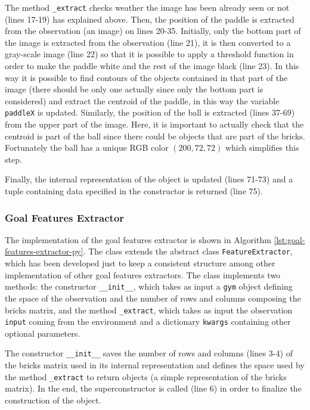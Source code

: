 The method \texttt{\_extract} checks weather the image has been already seen
or not (lines 17-19) has explained above. Then, the position of the paddle
is extracted from the observation (an image) on lines 20-35. Initially,
only the bottom part of the image is extracted from the observation (line 21),
it is then converted to a gray-scale image (line 22) so that it is possible
to apply a threshold function in order to make the paddle white and the
rest of the image black (line 23). In this way it is possible to find contours
of the objects contained in that part of the image (there should be only
one actually since only the bottom part is considered) and extract the centroid
of the paddle, in this way the variable
\texttt{paddleX} is updated. Similarly, the position of the ball is extracted
(lines 37-69) from the upper part of the image. Here, it is important to
actually check that the centroid is part of the ball since there could be
objects that are part of the bricks. Fortunately the ball has a unique RGB color
$(200, 72, 72)$ which simplifies this step.

Finally, the internal representation of the object is updated (lines 71-73)
and a tuple containing data specified in the constructor is returned (line 75).


\subsubsection{Goal Features Extractor}
The implementation of the goal features extractor is shown in Algorithm
\ref{lst:goal-features-extractor-py}. The class extends the abstract class
\texttt{FeatureExtractor}, which has been developed just to
keep a consistent structure among other implementation of other goal features
extractors. The class implements two methods: the constructor
\texttt{__init__}, which takes as input a \texttt{gym} object defining the space
of the observation and the number of rows and columns composing the bricks
matrix, and the method \texttt{_extract}, which takes as input
the observation \texttt{input} coming from the environment and a dictionary
\texttt{kwargs} containing other optional parameters.

The constructor \texttt{__init__} saves the number of rows and columns
(lines 3-4) of the
bricks matrix used in its internal representation and defines the space used
by the method \texttt{_extract} to return objects (a simple representation
of the bricks matrix). In the end, the superconstructor is called (line 6)
in order to finalize the construction of the object.

